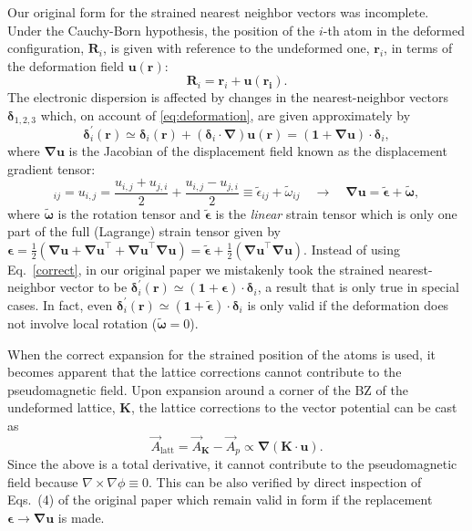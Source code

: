 Our original form for the strained nearest neighbor vectors was incomplete. Under the Cauchy-Born hypothesis, the position of the $i$-th atom in the deformed configuration, $\bm{R}_i$, is given with reference to the undeformed one, $\bm{r}_i$, in terms of the deformation field $\bm{u}(\bm{r})$:
%
\begin{equation}
  \bm{R}_{i}=\bm{r}_{i}+\bm{u}(\bm{r_i})
  \label{eq:deformation}.
\end{equation}
%
The electronic dispersion is affected by changes in the nearest-neighbor vectors $\bm{\delta}_{1,2,3}$ which, on account of \eqref{eq:deformation}, are given approximately by
%
\begin{equation}
\bm{\delta}_{i}^{\prime}(\bm{r})\simeq\bm{\delta}_{i}(\bm{r}
)+\left(\bm{\delta }_{i} \cdot\bm{\nabla}\right)\bm{u}(\bm{r})
= (\bm{1}+\bm{\nabla u})\cdot\bm{\delta }_{i}
\label{correct}
  ,
\end{equation}
%
where $\bm{\nabla}\bm{u}$ is the Jacobian of the displacement field known as the displacement gradient tensor:
%
\begin{equation*}
  [\bm{\nabla u}]_{ij} = u_{i,j}
  = \frac{u_{i,j}+u_{j,i}}{2} + \frac{u_{i,j}-u_{j,i}}{2}
  \equiv \tilde{\epsilon}_{ij} + \tilde{\omega}_{ij}
  \quad\longrightarrow\quad \bm{\nabla u} = \tilde{\bm{\epsilon}} +
\tilde{\bm{\omega}}
  ,
\end{equation*}
%
where $\tilde{\bm{\omega}}$ is the rotation tensor and $\tilde{\bm{\epsilon}}$ is the \emph{linear} strain tensor which is only one part of the full (Lagrange) strain tensor given by $\bm{\epsilon} = \tfrac{1}{2}(\bm{\nabla u} + \bm{\nabla u}^\top+\bm{\nabla u}^\top\bm{\nabla u}) = \tilde{\bm{\epsilon}} + \tfrac{1}{2}(\bm{\nabla u}^\top\bm{\nabla u})$.  Instead of using Eq.~\eqref{correct}, in our original paper we mistakenly took the strained nearest-neighbor vector to be $\bm{\delta}_{i}^{\prime}(\bm{r})\simeq (\bm{1}+\bm{\epsilon})\cdot\bm{\delta }_{i}$, a result that is only true in special cases.  In fact, even $\bm{\delta}_{i}^{\prime}(\bm{r})\simeq (\bm{1}+\tilde{\bm{\epsilon}})\cdot\bm{\delta }_{i}$ is only valid if the deformation does not involve local rotation ($\tilde{\bm{\omega}}=0$).


When the correct expansion for the strained position of the atoms is used, it becomes apparent that the lattice corrections cannot contribute to the pseudomagnetic field. Upon expansion around a corner of the BZ of the undeformed lattice, $\bm{K}$, the lattice corrections to the vector potential can be cast as \cite{DeJuan2013}
%
\begin{equation}
  \vec{A}_\text{latt}=\vec{A}_{\bm{K}}-\vec{A}_p \propto \bm{\nabla} (\bm{K}\cdot\bm{u})
  .
\end{equation}
%
Since the above is a total derivative, it cannot contribute to the pseudomagnetic field because $\nabla\times\nabla \phi \equiv 0$. This can be also verified by direct inspection of Eqs.~(4) of the original paper which remain valid in form if the replacement $\bm{\epsilon } \to \bm{ \nabla u }$ is made.

